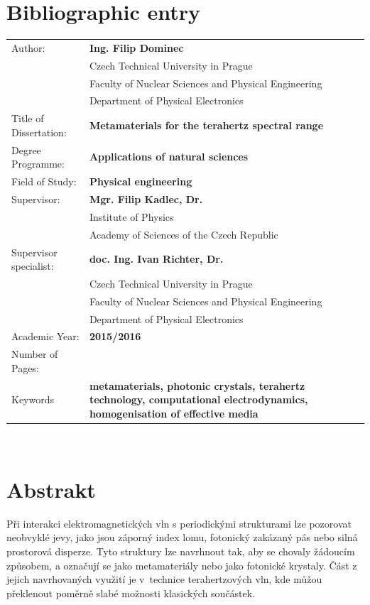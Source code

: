 {\let\clearpage\relax\chapter*{Bibliographic entry}}
\bgroup {}
\noindent\begin{tabular}{p{.30\linewidth}p{.65\linewidth}}
Author:					&\textbf{Ing. Filip Dominec} \\
					~	&Czech Technical University in Prague\\
					~	&Faculty of Nuclear Sciences and Physical Engineering\\ 
					~	&Department of Physical Electronics\\
Title of Dissertation:	&\textbf{Metamaterials for the terahertz spectral range} \\
Degree Programme:		&\textbf{Applications of natural sciences} \\
Field of Study:			&\textbf{Physical engineering} \\
Supervisor:				&\textbf{Mgr. Filip Kadlec, Dr.} \\
					~	&Institute of Physics\\ 
					~	&Academy of Sciences of the Czech Republic\\  %
Supervisor specialist:	&\textbf{doc. Ing. Ivan Richter, Dr.} \\
					~	&Czech Technical University in Prague\\ 
					~	&Faculty of Nuclear Sciences and Physical Engineering\\  
					~	&Department of Physical Electronics\\
Academic Year:			&\textbf{2015/2016} \\
Number of Pages:		&\textbf{\pageref{enddocument}} \\
Keywords				&\textbf{metamaterials, photonic crystals, terahertz technology, computational electrodynamics, homogenisation of effective media} \\
\end{tabular}
\egroup
\thispagestyle{empty} \newpage  ~ \thispagestyle{empty} \newpage \setcounter{page}{1}


\vspace{-20mm}
{\let\clearpage\relax\chapter*{Abstrakt}}
\noindent 
Při interakci elektromagnetických vln s periodickými strukturami lze pozorovat neobvyklé jevy, jako jsou záporný index lomu, fotonický zakázaný pás nebo silná prostorová disperze. Tyto struktury lze navrhnout tak, aby se chovaly žá\-dou\-cím způsobem, a označují se jako metamateriály nebo jako foto\-nic\-ké krys\-taly. Část z jejich navrhovaných využití je v~technice terahertzových vln, kde můžou překlenout po\-měr\-ně slabé možnosti kla\-sických součástek.  

